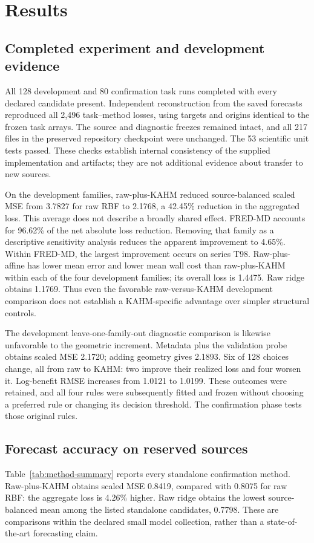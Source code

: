 \section{Results}\label{sec:results}

\subsection{Completed experiment and development evidence}
All 128 development and 80 confirmation task runs completed with every
declared candidate present. Independent reconstruction from the saved
forecasts reproduced all 2,496 task--method losses, using targets and
origins identical to the frozen task arrays. The source and diagnostic
freezes remained intact, and all 217 files in the preserved repository
checkpoint were unchanged. The 53 scientific unit tests passed. These
checks establish internal consistency of the supplied implementation and
artifacts; they are not additional evidence about transfer to new sources.

On the development families, raw-plus-KAHM reduced source-balanced scaled
MSE from 3.7827 for raw RBF to 2.1768, a 42.45\% reduction in the aggregated
loss. This average does not describe a broadly shared effect. FRED-MD
accounts for 96.62\% of the net absolute loss reduction. Removing that
family as a descriptive sensitivity analysis reduces the apparent
improvement to 4.65\%. Within FRED-MD, the largest improvement occurs on
series T98. Raw-plus-affine has lower mean error and lower mean wall cost
than raw-plus-KAHM within each of the four development families; its
overall loss is 1.4475. Raw ridge obtains 1.1769. Thus even the favorable
raw-versus-KAHM development comparison does not establish a KAHM-specific
advantage over simpler structural controls.

The development leave-one-family-out diagnostic comparison is likewise
unfavorable to the geometric increment. Metadata plus the validation probe
obtains scaled MSE 2.1720; adding geometry gives 2.1893. Six of 128 choices
change, all from raw to KAHM: two improve their realized loss and four
worsen it. Log-benefit RMSE increases from 1.0121 to 1.0199. These outcomes
were retained, and all four rules were subsequently fitted and frozen
without choosing a preferred rule or changing its decision threshold.
The confirmation phase tests those original rules.

\subsection{Forecast accuracy on reserved sources}
Table~\ref{tab:method-summary} reports every standalone confirmation method.
Raw-plus-KAHM obtains scaled MSE 0.8419, compared with 0.8075 for raw RBF:
the aggregate loss is 4.26\% higher. Raw ridge obtains the lowest
source-balanced mean among the listed standalone candidates, 0.7798.
These are comparisons within the declared small model collection, rather
than a state-of-the-art forecasting claim.


